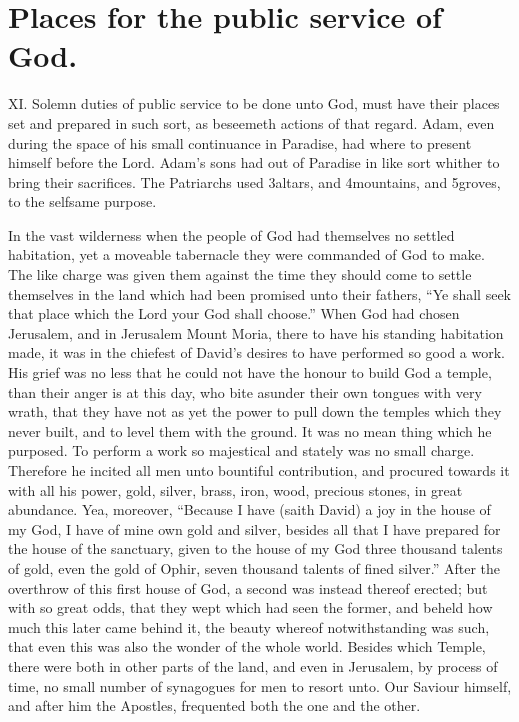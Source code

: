 \section*{Places for the public service of God.}
XI. Solemn duties of public service to be done unto God, must have their places set and prepared in such sort, as beseemeth actions of that regard. Adam, even during the space of his small continuance in Paradise, had where to present himself before the Lord. Adam’s sons had out of Paradise in like sort whither to bring their sacrifices. The Patriarchs used 3altars, and 4mountains, and 5groves, to the selfsame purpose.

In the vast wilderness when the people of God had themselves no settled habitation, yet a moveable tabernacle they were commanded of God to make. The like charge was given them against the time they should come to settle themselves in the land which had been promised unto their fathers, “Ye shall seek that place which the Lord your God shall choose.” When God had chosen Jerusalem, and in Jerusalem Mount Moria, there to have his standing habitation made, it was in the chiefest of David’s desires to have performed so good a work. His grief was no less that he could not have the honour to build God a temple, than their anger is at this day, who bite asunder their own tongues with very wrath, that they have not as yet the power to pull down the temples which they never built, and to level them with the ground. It was no mean thing which he purposed. To perform a work so majestical and stately was no small charge. Therefore he incited all men unto bountiful contribution, and procured towards it with all his power, gold, silver, brass, iron, wood, precious stones, in great abundance. Yea, moreover, “Because I have (saith David) a joy in the house of my God, I have of mine own gold and silver, besides all that I have prepared for the house of the sanctuary, given to the house of my God three thousand talents of gold, even the gold of Ophir, seven thousand talents of fined silver.” After the overthrow of this first house of God, a second was instead thereof erected; but with so great odds, that they wept which had seen the former, and beheld  how much this later came behind it, the beauty whereof notwithstanding was such, that even this was also the wonder of the whole world.
 Besides which Temple, there were both in other parts of the land, and even in Jerusalem, by process of time, no small number of synagogues for men to resort unto. Our Saviour himself, and after him the Apostles, frequented both the one and the other.

